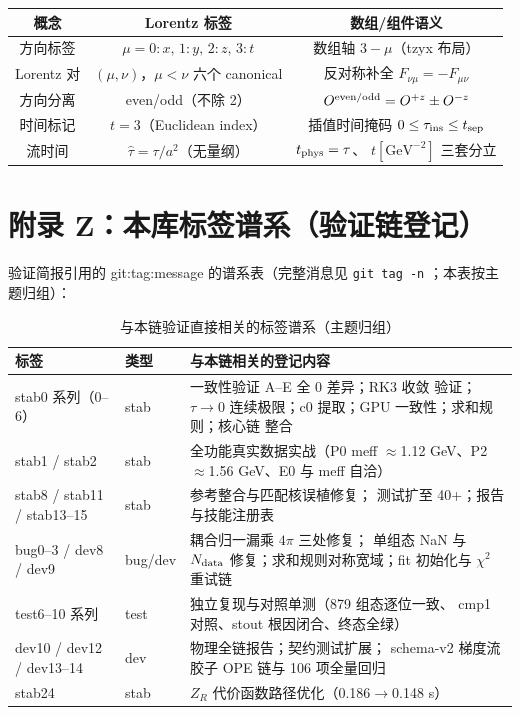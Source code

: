 \documentclass[11pt,a4paper]{ctexart}
\newcommand{\code}[1]{\texttt{#1}}
\newcommand{\zzh}{\widehat{\tau}}
\begin{document}
\begin{center}
\small
\begin{tabular}{c c c}
\toprule
\textbf{概念} & \textbf{Lorentz 标签} & \textbf{数组/组件语义} \\
\midrule
方向标签 & $\mu=0\!:\!x,\,1\!:\!y,\,2\!:\!z,\,3\!:\!t$ & 数组轴
$3-\mu$（tzyx 布局） \\
Lorentz 对 & $(\mu,\nu)$，$\mu<\nu$ 六个 canonical & 反对称补全
$F_{\nu\mu}=-F_{\mu\nu}$ \\
方向分离 & even/odd（不除 2） & $O^{\rm even/odd}
=O^{+z}\pm O^{-z}$ \\
时间标记 & $t=3$（Euclidean index） & 插值时间掩码
$0\le\tau_{\rm ins}\le t_{\rm sep}$ \\
流时间 & $\zzh=\tau/a^2$（无量纲） & $t_{\rm phys}=\tau$、
$t[\mathrm{GeV}^{-2}]$ 三套分立 \\
\bottomrule
\end{tabular}
\end{center}

\section{附录 Z：本库标签谱系（验证链登记）}

验证简报引用的 git:tag:message 的谱系表（完整消息见 \code{git tag -n}
；本表按主题归组）：

\begin{table}[htbp]
\centering
\caption{与本链验证直接相关的标签谱系（主题归组）}
\footnotesize
\begin{tabularx}{\textwidth}{@{}l l >{\raggedright\arraybackslash}X@{}}
\toprule
\textbf{标签} & \textbf{类型} & \textbf{与本链相关的登记内容} \\
\midrule
stab0 系列（0--6） & stab & 一致性验证 A--E 全 0 差异；RK3 收敛
验证；$\tau\to0$ 连续极限；c0 提取；GPU 一致性；求和规则；核心链
整合 \\
stab1 / stab2 & stab & 全功能真实数据实战（P0 meff $\approx$1.12
GeV、P2 $\approx$1.56 GeV、E0 与 meff 自洽） \\
stab8 / stab11 / stab13--15 & stab & 参考整合与匹配核误植修复；
测试扩至 40+；报告与技能注册表 \\
bug0--3 / dev8 / dev9 & bug/dev & 耦合归一漏乘 $4\pi$ 三处修复；
单组态 NaN 与 $N_{\rm data}$ 修复；求和规则对称宽域；fit 初始化与
$\chi^2$ 重试链 \\
test6--10 系列 & test & 独立复现与对照单测（879 组态逐位一致、
cmp1 对照、stout 根因闭合、终态全绿） \\
dev10 / dev12 / dev13--14 & dev & 物理全链报告；契约测试扩展；
schema-v2 梯度流胶子 OPE 链与 106 项全量回归 \\
stab24 & stab & $Z_R$ 代价函数路径优化（0.186$\to$0.148 s） \\
\bottomrule
\end{tabularx}
\end{table}
\end{document}
